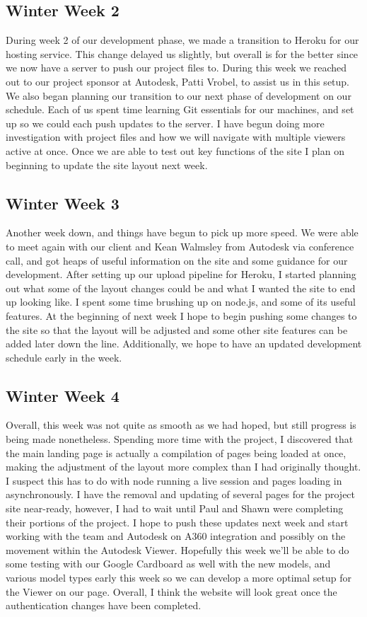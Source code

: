 \documentclass[letterpaper, 10pt, draftclsnofoot, compsoc, onecolumn]{IEEEtran}
\begin{document}
\subsection{Winter Week 2}

 During week 2 of our development phase, we made a transition to Heroku for our hosting service. This change delayed us slightly, but overall is for the better since we now have a server to push our project files to. During this week we reached out to our project sponsor at Autodesk, Patti Vrobel, to assist us in this setup. We also began planning our transition to our next phase of development on our schedule. Each of us spent time learning Git essentials for our machines, and set up so we could each push updates to the server. I have begun doing more investigation with project files and how we will navigate with multiple viewers active at once. Once we are able to test out key functions of the site I plan on beginning to update the site layout next week.
\subsection{Winter Week 3}

Another week down, and things have begun to pick up more speed. We were able to meet again with our client and Kean Walmsley from Autodesk via conference call, and got heaps of useful information on the site and some guidance for our development. After setting up our upload pipeline for Heroku, I started planning out what some of the layout changes could be and what I wanted the site to end up looking like. I spent some time brushing up on node.js, and some of its useful features. At the beginning of next week I hope to begin pushing some changes to the site so that the layout will be adjusted and some other site features can be added later down the line. Additionally, we hope to have an updated development schedule early in the week.
\subsection{Winter Week 4}

Overall, this week was not quite as smooth as we had hoped, but still progress is being made nonetheless. Spending more time with the project, I discovered that the main landing page is actually a compilation of pages being loaded at once, making the adjustment of the layout more complex than I had originally thought. I suspect this has to do with node running a live session and pages loading in asynchronously. I have the removal and updating of several pages for the project site near-ready, however, I had to wait until Paul and Shawn were completing their portions of the project. I hope to push these updates next week and start working with the team and Autodesk on A360 integration and possibly on the movement within the Autodesk Viewer. Hopefully this week we'll be able to do some testing with our Google Cardboard as well with the new models, and various model types early this week so we can develop a more optimal setup for the Viewer on our page. Overall, I think the website will look great once the authentication changes have been completed.
\end{document}

